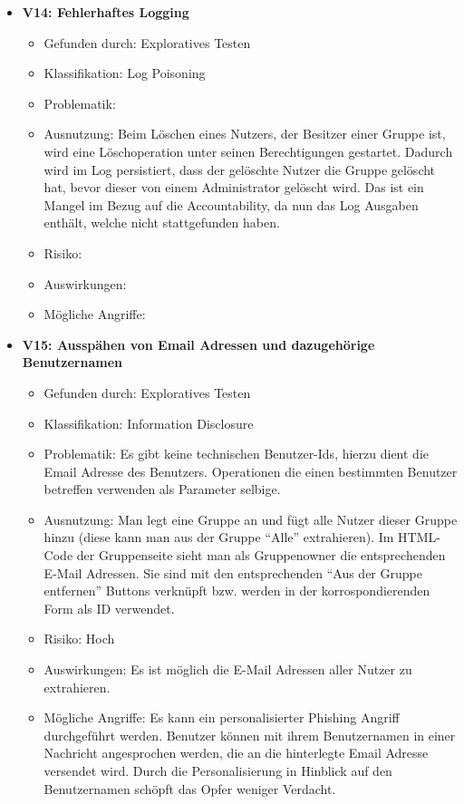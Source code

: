 \documentclass[12pt,DIV14,BCOR10mm,a4paper,parskip=half-,headsepline,headinclude,english,ngerman,bibliography=totocnumbered]{scrreprt}
\begin{document}
\begin{itemize}
  \hypertarget{vulnerability14}{}
  \item \textbf{V14: Fehlerhaftes Logging}
  \begin{itemize}
  \item Gefunden durch: Exploratives Testen
  \item Klassifikation: Log Poisoning
  \item Problematik:
  \item Ausnutzung: Beim Löschen eines Nutzers, der Besitzer einer Gruppe ist, wird eine Löschoperation unter seinen Berechtigungen gestartet. Dadurch wird im Log persistiert, dass der gelöschte Nutzer die Gruppe gelöscht hat, bevor dieser von einem Administrator gelöscht wird. Das ist ein Mangel im Bezug auf die Accountability, da nun das Log Ausgaben enthält, welche nicht stattgefunden haben.
  \item Risiko:
  \item Auswirkungen:
  \item Mögliche Angriffe:
  \end{itemize}

  \hypertarget{vulnerability15}{}
  \item \textbf{V15: Ausspähen von Email Adressen und dazugehörige Benutzernamen}
  \begin{itemize}
  \item Gefunden durch: Exploratives Testen
  \item Klassifikation: Information Disclosure
  \item Problematik: Es gibt keine technischen Benutzer-Ids, hierzu dient die Email Adresse des Benutzers. Operationen die einen bestimmten Benutzer betreffen verwenden als Parameter selbige.
  \item Ausnutzung: Man legt eine Gruppe an und fügt alle Nutzer dieser Gruppe hinzu (diese kann man aus der Gruppe \enquote{Alle} extrahieren). Im HTML-Code der Gruppenseite sieht man als Gruppenowner die entsprechenden E-Mail Adressen. Sie sind mit den entsprechenden \enquote{Aus der Gruppe entfernen} Buttons verknüpft bzw. werden in der korrospondierenden Form als ID verwendet.
  \item Risiko: Hoch
  \item Auswirkungen: Es ist möglich die E-Mail Adressen aller Nutzer zu extrahieren.
  \item Mögliche Angriffe: Es kann ein personalisierter Phishing Angriff durchgeführt werden. Benutzer können mit ihrem Benutzernamen in einer Nachricht angesprochen werden, die an die hinterlegte Email Adresse versendet wird. Durch die Personalisierung in Hinblick auf den Benutzernamen schöpft das Opfer weniger Verdacht.
  \end{itemize}


\end{itemize}
\end{document}
